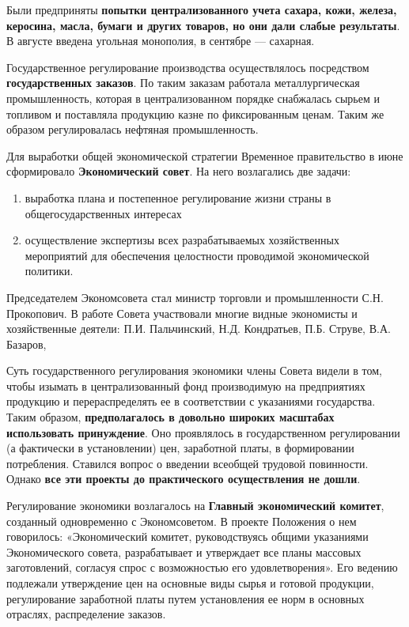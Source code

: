 \documentclass{article}
\begin{document}
\hfill

Были предприняты \textbf{попытки централизованного учета сахара, кожи, железа, керосина, масла, бумаги и других товаров, но они дали слабые результаты}. В августе введена угольная монополия, в сентябре — сахарная.

\hfill

Государственное регулирование производства осуществлялось посредством \textbf{государственных заказов}. По таким заказам работала металлургическая промышленность, которая в централизованном порядке снабжалась сырьем и топливом и поставляла продукцию казне по фиксированным ценам. Таким же образом регулировалась нефтяная промышленность.

\hfill

Для выработки общей экономической стратегии Временное правительство в июне сформировало \textbf{Экономический совет}. На него возлагались две задачи:

\begin{enumerate}
    \item выработка плана и постепенное регулирование жизни страны в общегосударственных интересах
    \item осуществление экспертизы всех разрабатываемых хозяйственных мероприятий для обеспечения целостности проводимой экономической политики.
\end{enumerate}

Председателем Экономсовета стал министр торговли и промышленности С.Н. Прокопович. В работе Совета участвовали многие видные экономисты и хозяйственные деятели: П.И. Пальчинский, Н.Д. Кондратьев, П.Б. Струве, В.А. Базаров,

\hfill

Суть государственного регулирования экономики члены Совета видели в том, чтобы изымать в централизованный фонд производимую на предприятиях продукцию и перераспределять ее в соответствии с указаниями государства. Таким образом, \textbf{предполагалось в довольно широких масштабах использовать принуждение}. Оно проявлялось в государственном регулировании (а фактически в установлении) цен, заработной платы, в формировании потребления. Ставился вопрос о введении всеобщей трудовой повинности. Однако \textbf{все эти проекты до практического осуществления не дошли}.

\hfill

Регулирование экономики возлагалось на \textbf{Главный экономический комитет}, созданный одновременно с Экономсоветом. В проекте Положения о нем говорилось: «Экономический комитет, руководствуясь общими указаниями Экономического совета, разрабатывает и утверждает все планы массовых заготовлений, согласуя спрос с возможностью его удовлетворения». Его ведению подлежали утверждение цен на основные виды сырья и готовой продукции, регулирование заработной платы путем установления ее норм в основных отраслях, распределение заказов.
\end{document}
